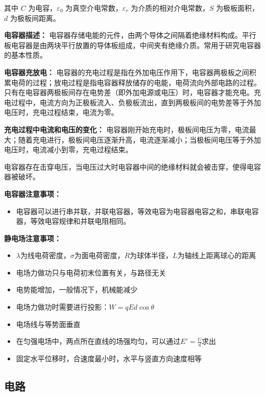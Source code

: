 其中 $C$ 为电容，$\varepsilon_0$ 为真空介电常数，$\varepsilon_r$ 为介质的相对介电常数，$S$ 为极板面积，$d$ 为极板间距离。

\textbf{电容器描述：}
电容器存储电能的元件，由两个导体之间隔着绝缘材料构成。平行板电容器是由两块平行放置的导体板组成，中间夹有绝缘介质。常用于研究电容器的基本性质。

\textbf{电容器充放电：}
电容器的充电过程是指在外加电压作用下，电容器两极板之间积累电荷的过程；放电过程是指电容器释放储存的电能，电荷流向外部电路的过程。只有在电容器两极板间存在电势差（即外加电源或电压）时，电容器才能充电。充电过程中，电流方向为正极板流入、负极板流出，直到两极板间的电势差等于外加电压时，充电过程结束，电流为零。

\textbf{充电过程中电流和电压的变化：}
电容器刚开始充电时，极板间电压为零，电流最大；随着充电进行，极板间电压逐渐升高，电流逐渐减小；当极板间电压等于外加电压时，电流减小到零，充电过程结束。

电容器存在击穿电压，当电压过大时电容器中间的绝缘材料就会被击穿，使得电容器被破坏。

\noindent\textbf{电容器注意事项：}
\begin{itemize}
  \item 电容器可以进行串并联，并联电容器，等效电容为电容器电容之和，串联电容器，等效电容规律和并联电阻相同。
\end{itemize}

\noindent\textbf{静电场注意事项：}
\begin{itemize}
  \item $\lambda$为线电荷密度，$\sigma$为面电荷密度，$R$为球体半径，$L$为轴线上距离球心的距离
  \item 电场力做功只与电荷初末位置有关，与路径无关
  \item 电势能增加，一般情况下，机械能减少
  \item 电场力做功时需要进行投影：$W=qEd\cos\theta$
  \item 电场线与等势面垂直
  \item 在匀强电场中，两点所在直线的场强均匀，可以通过$E'=\frac{U}{d}$求出
  \item 固定水平位移时，合速度最小时，水平与竖直方向速度相等
\end{itemize}

\subsection{电路}

